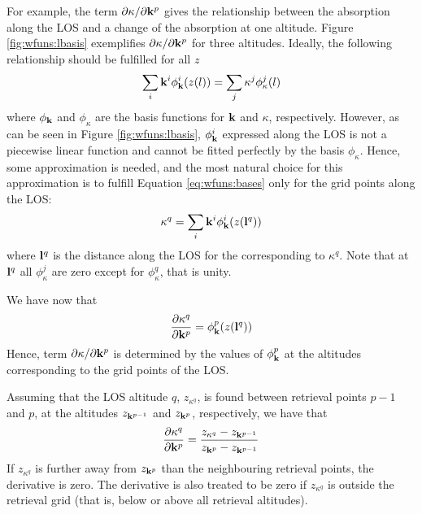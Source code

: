  For example, the term $\partial\kappa/ \partial \mathbf{k}^p$ gives the
 relationship between the absorption along the LOS and a change of the
 absorption at one altitude.  Figure \ref{fig:wfuns:lbasis}
 exemplifies $\partial\kappa/ \partial \mathbf{k}^p$ for three altitudes.
 Ideally, the following relationship should be fulfilled for all $z$
 \begin{equation}
   \sum_i\mathbf{k}^i\phi^i_{\mathbf{k}}(z(l)) = \sum_j \kappa^j\phi^j_{\kappa}(l)
  \label{eq:wfuns:bases}
 \end{equation}
 where $\phi_{\mathbf{k}}$ and $\phi_{\kappa}$ are the basis functions for
 $\mathbf{k}$ and $\kappa$, respectively. However, as can be seen in
 Figure \ref{fig:wfuns:lbasis}, $\phi^i_{\mathbf{k}}$ expressed along the
 LOS is not a piecewise linear function and cannot be fitted perfectly
 by the basis $\phi_{\kappa}$. Hence, some approximation is needed,
 and the most natural choice for this approximation is to fulfill
 Equation \ref{eq:wfuns:bases} only for the grid points along the LOS:
 \begin{equation}
   \kappa^q = \sum_i\mathbf{k}^i\phi^i_{\mathbf{k}}(z(\mathbf{l}^q))
 \end{equation}
 where $\mathbf{l}^q$ is the distance along the LOS for the corresponding to
 $\kappa^q$. Note that at $\mathbf{l}^q$ all $\phi_{\kappa}^j$ are zero except
 for $\phi_{\kappa}^q$, that is unity.

 We have now that
 \begin{equation}
   \frac{\partial \kappa^q}{\partial \mathbf{k}^p} = \phi^p_{\mathbf{k}}(z(\mathbf{l}^q))
  \label{eq:wfuns:kappak}
 \end{equation}
 Hence, term $\partial\kappa/ \partial \mathbf{k}^p$ is determined by the
 values of $\phi^p_{\mathbf{k}}$ at the altitudes corresponding to the grid
 points of the LOS.
 
 Assuming that the LOS altitude $q$, $z_{\kappa^q}$, is found between
 retrieval points $p-1$ and $p$, at the altitudes $z_{\mathbf{k}^{p-1}}$ and 
 $z_{\mathbf{k}^p}$, respectively, we have that
 \begin{equation}
   \frac{\partial \kappa^q}{\partial \mathbf{k}^p} =
   \frac{z_{\kappa^q}-z_{\mathbf{k}^{p-1}}}{z_{\mathbf{k}^{p}}-z_{\mathbf{k}^{p-1}}}
  \label{eq:wfuns:zz}
 \end{equation}
 If $z_{\kappa^q}$ is further away from $z_{\mathbf{k}^p}$ than the neighbouring
 retrieval points, the derivative is zero. The derivative is also treated to 
 be zero if $z_{\kappa^q}$ is outside the retrieval grid (that is, below
 or above all retrieval altitudes).

